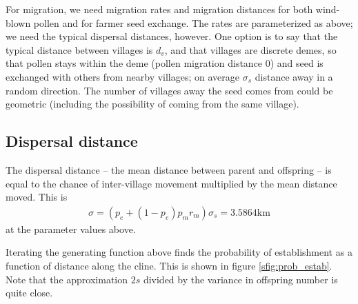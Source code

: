 For migration, we need migration rates and migration distances for both wind-blown pollen
and for farmer seed exchange.
The rates are parameterized as above;
we need the typical dispersal distances, however.
One option is to say that the typical distance between villages is $d_v$,
and that villages are discrete demes,
so that pollen stays within the deme (pollen migration distance 0)
and seed is exchanged with others from nearby villages;
on average $\sigma_s$ distance away in a random direction.
The number of villages away the seed comes from could be geometric 
(including the possibility of coming from the same village).

\subsection{Dispersal distance}

The dispersal distance
-- the mean distance between parent and offspring --
is equal to the chance of inter-village movement
multiplied by the mean distance moved.
This is
\begin{align}
  \sigma = (p_e + (1-p_e) p_m r_m ) \sigma_s = 3.5864 \text{km}
\end{align}
at the parameter values above.

Iterating the generating function above finds the probability of establishment as a function of distance along the cline.
This is shown in figure \ref{sfig:prob_estab}.
Note that the approximation $2s$ divided by the variance in offspring number is quite close.

